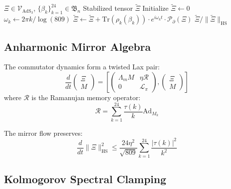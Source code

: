 \documentclass[12pt]{article}
\begin{document}
\begin{algorithm}[H]
\caption{Braided Projection Kernel}
\begin{algorithmic}[1]
\Require $\Xi \in \mathcal{V}_{\text{AdS}_3}$, $\{\beta_k\}_{k=1}^{24} \in \mathfrak{B}_n$
\Ensure Stabilized tensor $\tilde{\Xi}$
\State Initialize $\tilde{\Xi} \gets 0$
    \State $\omega_k \gets 2\pi k/\log(809)$
    \State $\tilde{\Xi} \gets \tilde{\Xi} + \text{Tr}(\rho_k(\beta_k)) \cdot e^{i\omega_k t} \cdot \mathcal{P}_{\partial}(\Xi)$
\EndFor
\State \Return $\tilde{\Xi}/\|\tilde{\Xi}\|_{\text{HS}}$
\end{algorithmic}
\end{algorithm}

\subsection{Anharmonic Mirror Algebra}

The commutator dynamics form a twisted Lax pair:
\begin{equation}
    \frac{d}{dt} \begin{pmatrix} \Xi \\ M \end{pmatrix} = \left[ \begin{pmatrix} \Lambda_m M & \eta \mathcal{R} \\ 0 & \mathcal{L}_\pi \end{pmatrix}, \begin{pmatrix} \Xi \\ M \end{pmatrix} \right]
\end{equation}
where $\mathcal{R}$ is the Ramanujan memory operator:
\begin{equation}
    \mathcal{R} = \sum_{k=1}^{24} \frac{\tau(k)}{k} \text{Ad}_{M_k}
\end{equation}

\begin{theorem}
The mirror flow preserves:
\begin{equation}
    \frac{d}{dt} \|\Xi\|_{\text{HS}}^2 \leq \frac{24\eta^2}{\sqrt{809}} \sum_{k=1}^{24} \frac{|\tau(k)|^2}{k^2}
\end{equation}
\end{theorem}

\subsection{Kolmogorov Spectral Clamping}
\end{document}
